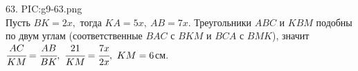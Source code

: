 63. {{PIC:g9-63.png}}\\
Пусть $BK=2x,$ тогда $KA=5x,\ AB=7x.$ Треугольники $ABC$ и $KBM$ подобны по двум углам (соответственные $BAC$ с $BKM$ и $BCA$ с $BMK$), значит $\cfrac{AC}{KM}=\cfrac{AB}{BK},\ \cfrac{21}{KM}=\cfrac{7x}{2x},\ KM=6$см.\\
